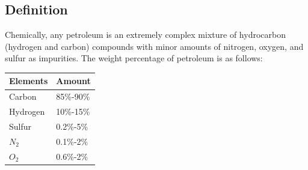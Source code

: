 \documentclass{article}
\begin{document}
\subsection*{Definition}
Chemically, any petroleum is an extremely complex mixture of hydrocarbon (hydrogen and carbon) compounds with minor amounts of nitrogen, oxygen, and sulfur as impurities. The weight percentage of petroleum is as follows:
\\
\begin{center}
\begin{tabularx}{\textwidth}{X X}
  \hline
  \textbf{Elements} & \textbf{Amount} \\
  \hline
  Carbon & 85\%-90\% \\
  Hydrogen & 10\%-15\% \\
  Sulfur & 0.2\%-5\% \\
  $N_{2}$ & 0.1\%-2\% \\
  $O_{2}$ & 0.6\%-2\% \\
  \hline
\end{tabularx}
\end{center}
\end{document}
